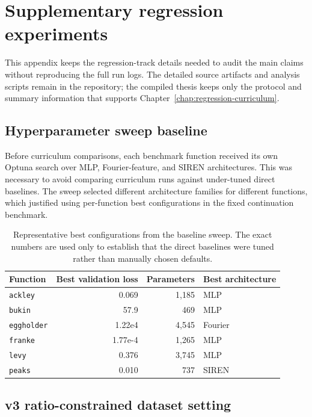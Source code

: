 \chapter{Supplementary regression experiments}
\label{app:supplementary-regression-experiments}

This appendix keeps the regression-track details needed to audit the main
claims without reproducing the full run logs. The detailed source artifacts and
analysis scripts remain in the repository; the compiled thesis keeps only the
protocol and summary information that supports Chapter~\ref{chap:regression-curriculum}.

\section{Hyperparameter sweep baseline}
\label{app:sweep-pack-v1}

Before curriculum comparisons, each benchmark function received its own Optuna
search over MLP, Fourier-feature, and SIREN architectures. This was necessary to
avoid comparing curriculum runs against under-tuned direct baselines. The sweep
selected different architecture families for different functions, which justified
using per-function best configurations in the fixed continuation benchmark.

\begin{table}[h]
\centering
\small
\begin{tabular}{lrrl}
\toprule
Function & Best validation loss & Parameters & Best architecture \\
\midrule
\texttt{ackley} & 0.069 & 1,185 & MLP \\
\texttt{bukin} & 57.9 & 469 & MLP \\
\texttt{eggholder} & 1.22e4 & 4,545 & Fourier \\
\texttt{franke} & 1.77e-4 & 1,265 & MLP \\
\texttt{levy} & 0.376 & 3,745 & MLP \\
\texttt{peaks} & 0.010 & 737 & SIREN \\
\bottomrule
\end{tabular}
\caption{Representative best configurations from the baseline sweep. The exact
numbers are used only to establish that the direct baselines were tuned rather
than manually chosen defaults.}
\label{tab:app-regression-sweep-summary}
\end{table}

\section{v3 ratio-constrained dataset setting}
\label{app:sweep-pack-v3-setup}

